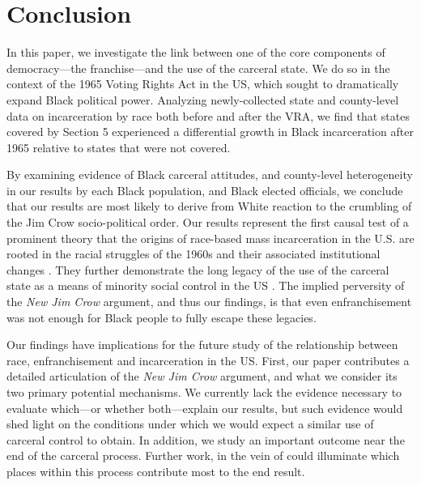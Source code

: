 \documentclass[12pt]{article}
\begin{document}
\section{Conclusion}

In this paper, we investigate the link between one of the core components of democracy---the franchise---and the use of the carceral state.  We do so in the context of the 1965 Voting Rights Act in the US, which sought to dramatically expand Black political power.  Analyzing newly-collected state and county-level data on incarceration by race both before and after the VRA, we find that states covered by Section 5 experienced a differential growth in Black incarceration after 1965 relative to states that were not covered.

By examining evidence of Black carceral attitudes, and county-level heterogeneity in our results by each Black population, and Black elected officials, we conclude that our results are most likely to derive from White reaction to the crumbling of the Jim Crow socio-political order. Our results represent the first causal test of a prominent theory that the origins of race-based mass incarceration in the U.S. are rooted in the racial struggles of the 1960s and their associated institutional changes \citep{Alexander:2012tj}. They further demonstrate the long legacy of the use of the carceral state as a means of minority social control in the US \citep{Oshinsky:1997up,Blackmon:2009wo,Muhammad:2011wf,Mazumder:2019tp}.  The implied perversity of the \emph{New Jim Crow} argument, and thus our findings, is that even enfranchisement was not enough for Black people to fully escape these legacies.

Our findings have implications for the future study of the relationship between race, enfranchisement and incarceration in the US.  First, our paper contributes a detailed articulation of the \emph{New Jim Crow} argument, and what we consider its two primary potential mechanisms.  We currently lack the evidence necessary to evaluate which---or whether both---explain our results, but such evidence would shed light on the conditions under which we would expect a similar use of carceral control to obtain.  In addition, we study an important outcome near the end of the carceral process.  Further work, in the vein of \cite{Facchini:2020tb} could illuminate which places within this process contribute most to the end result.
\end{document}
